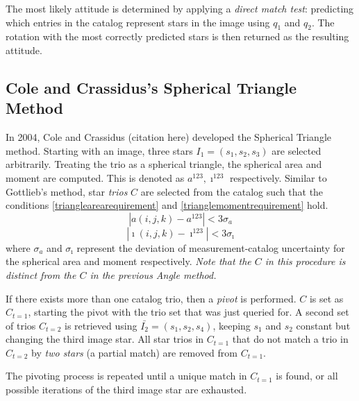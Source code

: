 The most likely attitude is determined by applying a \textit{direct match test}: predicting which entries in the catalog represent stars in the image using $q_1$ and $q_2$. The rotation with the most correctly predicted stars is then returned as the resulting attitude. 

\subsection{Cole and Crassidus's Spherical Triangle Method}
In 2004, Cole and Crassidus (citation here) developed the Spherical Triangle method. Starting with an image, three stars $I_1 = (s_1, s_2, s_3)$ are selected arbitrarily. Treating the trio as a spherical triangle, the spherical area and moment are computed. This is denoted as $a^{123}, \imath^{123}$ respectively. Similar to Gottlieb's method, star \textit{trios} $C$ are selected from the catalog such that the conditions \eqref{trianglearearequirement} and \eqref{trianglemomentrequirement} hold. 
\begin{equation}
\label{trianglearearequirement}
| a(i, j, k) - a^{123} | < 3 \sigma_a
\end{equation}
\begin{equation}
\label{trianglemomentrequirement}
| \imath(i, j, k) - \imath^{123} | < 3\sigma_{\imath}
\end{equation}
where $\sigma_a$ and $\sigma_{\imath}$ represent the deviation of measurement-catalog uncertainty for the spherical area and moment respectively. \textit{Note that the $C$ in this procedure is distinct from the $C$ in the previous Angle method.}

If there exists more than one catalog trio, then a \textit{pivot} is performed. $C$ is set as $C_{t=1}$, starting the pivot with the trio set that was just queried for. A second set of trios $C_{t=2}$ is retrieved using $\bar{I_2} = (s_1, s_2, s_4)$, keeping $s_1$ and $s_2$ constant but changing the third image star. All star trios in $C_{t=1}$ that do not match a trio in $C_{t=2}$ by \textit{two stars} (a partial match) are removed from $C_{t=1}$. 

The pivoting process is repeated until a unique match in $C_{t=1}$ is found, or all possible iterations of the third image star are exhausted. 

